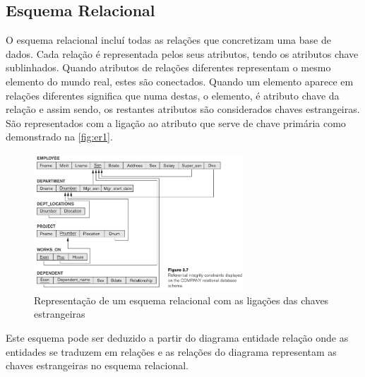 \documentclass[11pt,twoside,a4paper]{report}
\begin{document}
\subsection{Esquema Relacional}
O esquema relacional incluí todas as relações que concretizam uma base de dados. Cada relação é representada pelos seus atributos, tendo os atributos chave sublinhados. Quando atributos de relações diferentes representam o mesmo elemento do mundo real, estes são conectados. Quando um elemento aparece em relações diferentes significa que numa destas, o elemento, é atributo chave da relação e assim sendo, os restantes atributos são considerados chaves estrangeiras. São representados com a ligação ao atributo que serve de chave primária como demonstrado na \autoref{fig:er1}\cite{Chen}.
\begin{figure}[H]
	\begin{center}
		\includegraphics[width=0.7\textwidth]{notacao9} %
		\caption{Representação de um esquema relacional com as ligações das chaves estrangeiras}
		\label{fig:er1}
	\end{center}
\end{figure}
Este esquema pode ser deduzido a partir do diagrama entidade relação onde as entidades se traduzem em relações e as relações do diagrama representam as chaves estrangeiras no esquema relacional.
\end{document}
